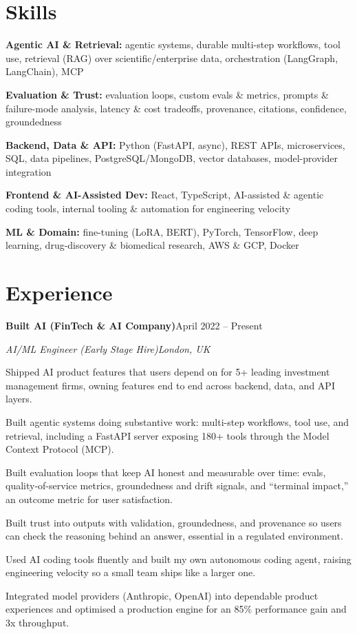 \documentclass[10pt,a4paper]{article}
\newcommand{\entry}[4]{%
  {\color{company}\bfseries #1}\hfill {\color{muted}#2}\par
  \vspace{1pt}
  {\itshape #3}\hfill {\color{muted}\itshape #4}\par
  \vspace{3pt}%
}
\begin{document}
\section{Skills}
\begin{tight}
  \item[\textcolor{accent}{\small$\bullet$}] \textbf{Agentic AI \& Retrieval:} agentic systems, durable multi-step workflows, tool use, retrieval (RAG) over scientific/enterprise data, orchestration (LangGraph, LangChain), MCP
  \item[\textcolor{accent}{\small$\bullet$}] \textbf{Evaluation \& Trust:} evaluation loops, custom evals \& metrics, prompts \& failure-mode analysis, latency \& cost tradeoffs, provenance, citations, confidence, groundedness
  \item[\textcolor{accent}{\small$\bullet$}] \textbf{Backend, Data \& API:} Python (FastAPI, async), REST APIs, microservices, SQL, data pipelines, PostgreSQL/MongoDB, vector databases, model-provider integration
  \item[\textcolor{accent}{\small$\bullet$}] \textbf{Frontend \& AI-Assisted Dev:} React, TypeScript, AI-assisted \& agentic coding tools, internal tooling \& automation for engineering velocity
  \item[\textcolor{accent}{\small$\bullet$}] \textbf{ML \& Domain:} fine-tuning (LoRA, BERT), PyTorch, TensorFlow, deep learning, drug-discovery \& biomedical research, AWS \& GCP, Docker
\end{tight}

\section{Experience}
\entry{Built AI (FinTech \& AI Company)}{April 2022 -- Present}{AI/ML Engineer (Early Stage Hire)}{London, UK}
\begin{tight}
  \item Shipped AI product features that users depend on for 5+ leading investment management firms, owning features end to end across backend, data, and API layers.
  \item Built agentic systems doing substantive work: multi-step workflows, tool use, and retrieval, including a FastAPI server exposing 180+ tools through the Model Context Protocol (MCP).
  \item Built evaluation loops that keep AI honest and measurable over time: evals, quality-of-service metrics, groundedness and drift signals, and ``terminal impact,'' an outcome metric for user satisfaction.
  \item Built trust into outputs with validation, groundedness, and provenance so users can check the reasoning behind an answer, essential in a regulated environment.
  \item Used AI coding tools fluently and built my own autonomous coding agent, raising engineering velocity so a small team ships like a larger one.
  \item Integrated model providers (Anthropic, OpenAI) into dependable product experiences and optimised a production engine for an 85\% performance gain and 3x throughput.
\end{tight}
\end{document}

